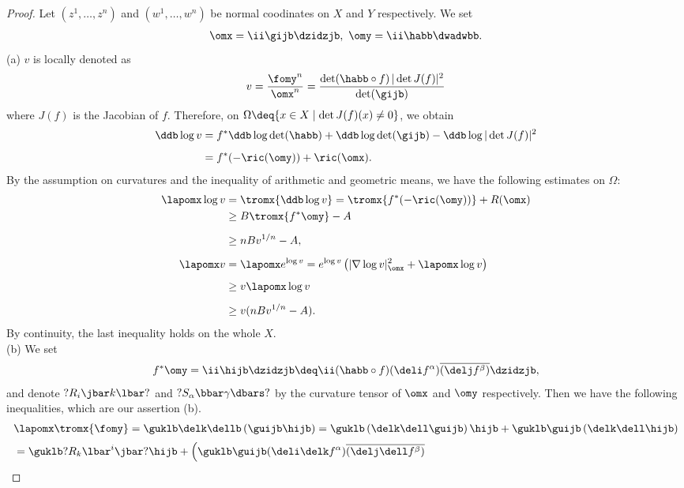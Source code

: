 \documentclass[12pt]{amsart}
\begin{document}
\begin{proof}
Let $(z^1, \dots, z^n)$ and $(w^1, \dots, w^n)$ be normal coodinates on $X$ and $Y$ respectively. We set
\begin{align*}
	\omx = \ii \gijb \dzidzjb , \ \omy = \ii \habb \dwadwbb.
\end{align*}
\noindent
(a) 
$v$ is locally denoted as 
\begin{align}\label{vollocal}
	v = \dfrac{\fomy^n}{\omx^n} = \dfrac{\det(\habb \circ f )\,  |\det J(f)|^2}{\det (\gijb )} 
\end{align}
where $J(f)$ is the  Jacobian of $f$. Therefore, on $\Omega\deq \{ x\in X \mid \det J(f)(x)\neq 0  \}$, we obtain
\begin{align*}
	\ddb \log v
		&=  f^\ast \ddb \log \det(\habb) + \ddb \log \det (\gijb ) - \ddb \log |\det J(f)|^2 \\[5pt]
		&= f^\ast (- \ric (\omy ) ) + \ric (\omx ) .
\end{align*}
By the assumption on curvatures and the inequality of arithmetic and geometric means, we have the following estimates on $\Omega$: 
\begin{align*}
	\lapomx \log v 
		&= \tromx{ \ddb \log v  } =\tromx{ f^\ast (- \ric (\omy ) )} + R (\omx ) \\
		&\ge B \tromx{f^\ast \omy } - A \\[5pt]
		&\ge nB  v^{1/n} - A, \\[5pt]
	\lapomx v
		&= \lapomx e^{\log v} = e^{\log v} \left( |\nabla \log v|_{\omx}^2 + \lapomx \log v \right)\\[5pt]
		&\ge v \lapomx \log v \\[5pt]
		&\ge v (nB v^{1/n} - A ) .
\end{align*}
 By continuity, the last inequality holds on the whole $X$.  \\

\noindent 
(b) We set
\begin{align*}
	f^\ast \omy = \ii \hijb \dzidzjb \deq  \ii (\habb\circ f )  (\deli f^\alpha )  \overline{(\delj f^\beta)}\dzidzjb,
\end{align*}
and denote $?R_i \jbar k \lbar ?$ and $?S_\alpha \bbar \gamma \dbars ? $ by the curvature tensor of $\omx$ and $\omy$ respectively.
Then we have the following inequalities, which are our assertion (b).
\begin{align*}
	&\lapomx \tromx{\fomy }
		= \guklb \delk \dellb \left( \guijb \hijb \right)
		=\guklb \left( \delk \dell \guijb  \right)\hijb
				+ \guklb \guijb \left(   \delk \dell \hijb  \right)\\[2pt]
		&=\guklb ?R_k \lbar ^i\jbar ? \hijb 
				+\Bigl(  
						\guklb \guijb (\deli \delk f^\alpha ) \overline{(\delj \dell f^\beta)}
		

\end{align*}
\end{proof}
\end{document}
